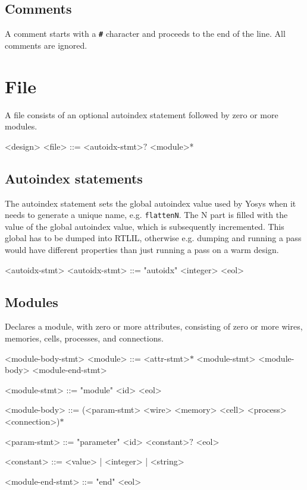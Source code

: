 \subsection{Comments}

A comment starts with a \texttt{\textbf{\#}} character and proceeds to the end of the line. All comments are ignored.

\section{File}

A file consists of an optional autoindex statement followed by zero or more modules.

\begin{indentgrammar}{<design>}
<file> ::= <autoidx-stmt>$?$ <module>*
\end{indentgrammar}

\subsection{Autoindex statements}

The autoindex statement sets the global autoindex value used by Yosys when it needs to generate a unique name, e.g. \texttt{\textdollar{}flatten\textdollar{}N}. The N part is filled with the value of the global autoindex value, which is subsequently incremented. This global has to be dumped into RTLIL, otherwise e.g. dumping and running a pass would have different properties than just running a pass on a warm design.

\begin{indentgrammar}{<autoidx-stmt>}
<autoidx-stmt> ::= "autoidx" <integer> <eol>
\end{indentgrammar}

\subsection{Modules}

Declares a module, with zero or more attributes, consisting of zero or more wires, memories, cells, processes, and connections.

\begin{indentgrammar}{<module-body-stmt>}
<module> ::= <attr-stmt>$*$ <module-stmt> <module-body> <module-end-stmt>

<module-stmt> ::= "module" <id> <eol>

<module-body> ::= 
(<param-stmt>
  \alt <wire>
  \alt <memory>
  \alt <cell>
  \alt <process>
  \alt <connection>)$*$

<param-stmt> ::= "parameter" <id> <constant>$?$ <eol>

<constant> ::= <value> | <integer> | <string>

<module-end-stmt> ::= "end" <eol>
\end{indentgrammar}

